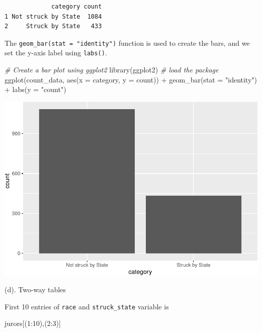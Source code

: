 \documentclass[
]{book}
\newenvironment{Shaded}{\begin{snugshade}}{\end{snugshade}}
\newcommand{\AttributeTok}[1]{\textcolor[rgb]{0.77,0.63,0.00}{#1}}
\newcommand{\CommentTok}[1]{\textcolor[rgb]{0.56,0.35,0.01}{\textit{#1}}}
\newcommand{\DecValTok}[1]{\textcolor[rgb]{0.00,0.00,0.81}{#1}}
\newcommand{\FunctionTok}[1]{\textcolor[rgb]{0.00,0.00,0.00}{#1}}
\newcommand{\NormalTok}[1]{#1}
\newcommand{\SpecialCharTok}[1]{\textcolor[rgb]{0.00,0.00,0.00}{#1}}
\newcommand{\StringTok}[1]{\textcolor[rgb]{0.31,0.60,0.02}{#1}}
\begin{document}
\begin{verbatim}
             category count
1 Not struck by State  1084
2     Struck by State   433
\end{verbatim}

The \texttt{geom\_bar(stat\ =\ "identity")} function is used to create the bars, and we set the y-axis label using \texttt{labs()}.

\begin{Shaded}
\begin{Highlighting}[]
\CommentTok{\# Create a bar plot using ggplot2}
\FunctionTok{library}\NormalTok{(ggplot2)  }\CommentTok{\# load the package}
\FunctionTok{ggplot}\NormalTok{(count\_data, }\FunctionTok{aes}\NormalTok{(}\AttributeTok{x =}\NormalTok{ category, }\AttributeTok{y =}\NormalTok{ count)) }\SpecialCharTok{+}
  \FunctionTok{geom\_bar}\NormalTok{(}\AttributeTok{stat =} \StringTok{"identity"}\NormalTok{) }\SpecialCharTok{+}
  \FunctionTok{labs}\NormalTok{(}\AttributeTok{y =} \StringTok{"count"}\NormalTok{)}
\end{Highlighting}
\end{Shaded}

\includegraphics[width=1\linewidth]{Class_Activity_4_files/figure-latex/unnamed-chunk-10-1}

(d). Two-way tables

First 10 entries of \texttt{race} and \texttt{struck\_state} variable is

\begin{Shaded}
\begin{Highlighting}[]
\NormalTok{jurors[(}\DecValTok{1}\SpecialCharTok{:}\DecValTok{10}\NormalTok{),(}\DecValTok{2}\SpecialCharTok{:}\DecValTok{3}\NormalTok{)]}
\end{Highlighting}
\end{Shaded}
\end{document}
